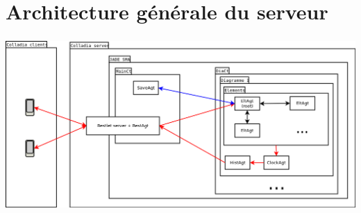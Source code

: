 \documentclass[11pt]{beamer}
\begin{document}
\section{Architecture générale du serveur}
\begin{frame}
	\frametitle{\currentname}
	\begin{center}
		\includegraphics[width=\textwidth]{img/general_server}
	\end{center}
\end{frame}
\end{document}
